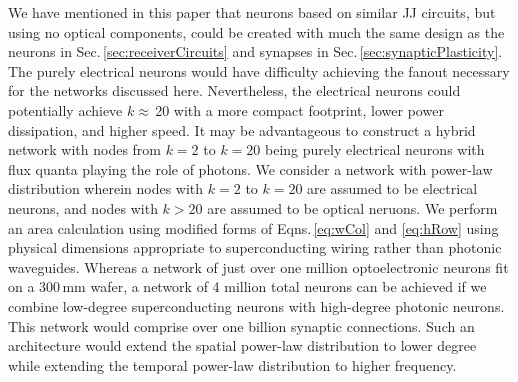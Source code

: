 \documentclass[twocolumn]{article}
\begin{document}
We have mentioned in this paper that neurons based on similar JJ circuits, but using no optical components, could be created with much the same design as the neurons in Sec.\,\ref{sec:receiverCircuits} and synapses in Sec.\,\ref{sec:synapticPlasticity}. The purely electrical neurons would have difficulty achieving the fanout necessary for the networks discussed here. Nevertheless, the electrical neurons could potentially achieve $k\approx$\,20 with a more compact footprint, lower power dissipation, and higher speed. It may be advantageous to construct a hybrid network with nodes from $k = 2$ to $k = 20$ being purely electrical neurons with flux quanta playing the role of photons. We consider a network with power-law distribution wherein nodes with $k = 2$ to $k = 20$ are assumed to be electrical neurons, and nodes with $k > 20$ are assumed to be optical neruons. We perform an area calculation using modified forms of Eqns.\,\ref{eq:wCol} and \ref{eq:hRow} using physical dimensions appropriate to superconducting wiring rather than photonic waveguides. Whereas a network of just over one million optoelectronic neurons fit on a 300\,mm wafer, a network of 4 million total neurons can be achieved if we combine low-degree superconducting neurons with high-degree photonic neurons. This network would comprise over one billion synaptic connections. Such an architecture would extend the spatial power-law distribution to lower degree while extending the temporal power-law distribution to higher frequency. 
\end{document}
